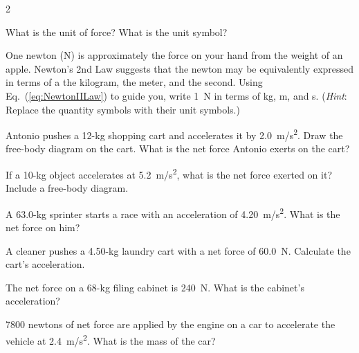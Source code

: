 \documentclass{article}
\numberwithin{equation}{section}
\numberwithin{figure}{section}
\begin{document}
\begin{multicols}{2}

\begin{exercise} \label{01Hh51}
What is the unit of force? What is the unit symbol?
\end{exercise}

\begin{exercise} \label{YQwD8z}
One newton (N) is approximately the force on your hand from the weight of an apple. Newton's 2nd Law suggests that the newton may be equivalently expressed in terms of a the kilogram, the meter, and the second.  Using Eq.~(\ref{eq:NewtonIILaw}) to guide you, write \SI{1}{N} in terms of kg, m, and s. (\textit{Hint}: Replace the quantity symbols with their unit symbols.)
\end{exercise}

\begin{exercise} \label{aBCVA3}
Antonio pushes a 12-kg shopping cart and accelerates it by \SI{2.0}{m/s^2}. Draw the free-body diagram on the cart. What is the net force Antonio exerts on the cart?
\end{exercise}

\begin{exercise} \label{Sm9Zw6}
    If a 10-kg object accelerates at \SI{5.2}{m/s^2}, what is the net force exerted on it? Include a free-body diagram.  
\end{exercise}

\begin{exercise} \label{RbjKEg}
    A 63.0-kg sprinter starts a race with an acceleration of \SI{4.20}{m/s^2}. What is the net force on him?
\end{exercise}

\begin{exercise} \label{goj4oA}
    A cleaner pushes a 4.50-kg laundry cart with a net force of \SI{60.0}{N}. Calculate the cart's acceleration.
\end{exercise}

\begin{exercise} \label{G333de}
    The net force on a 68-kg filing cabinet is \SI{240}{N}. What is the cabinet's acceleration?
\end{exercise}

\begin{exercise} \label{8M4KDp}
    7800 newtons of net force are applied by the engine on a car to accelerate the vehicle at \SI{2.4}{m/s^2}. What is the mass of the car?
\end{exercise}


\end{multicols}
\end{document}
